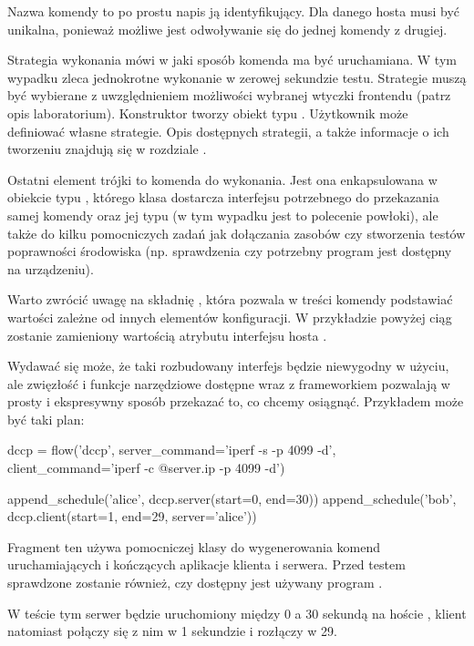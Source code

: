 \documentclass[00-praca-magisterska.tex]{subfiles}
\begin{document}
Nazwa komendy to po prostu napis ją identyfikujący. Dla danego hosta musi być
unikalna, ponieważ możliwe jest odwoływanie się do jednej komendy z drugiej.

Strategia wykonania mówi w jaki sposób komenda ma być uruchamiana. W tym
wypadku  zleca jednokrotne wykonanie w zerowej sekundzie testu.
Strategie muszą być wybierane z uwzględnieniem możliwości wybranej wtyczki
frontendu (patrz opis laboratorium). Konstruktor  tworzy obiekt typu
. Użytkownik może definiować własne strategie. Opis dostępnych
strategii, a także informacje o ich tworzeniu znajdują się w rozdziale
.

Ostatni element trójki to komenda do wykonania. Jest ona enkapsulowana w
obiekcie typu , którego klasa dostarcza interfejsu
potrzebnego do przekazania samej komendy oraz jej typu (w tym wypadku jest to
polecenie powłoki), ale także do kilku pomocniczych zadań jak dołączania
zasobów czy stworzenia testów poprawności środowiska (np. sprawdzenia czy
potrzebny program jest dostępny na urządzeniu).

Warto zwrócić uwagę na składnię , która pozwala w treści komendy
podstawiać wartości zależne od innych elementów konfiguracji. W przykładzie
powyżej ciąg  zostanie zamieniony wartością atrybutu
 interfejsu  hosta .

Wydawać się może, że taki rozbudowany interfejs będzie niewygodny w użyciu, ale
zwięzłość i funkcje narzędziowe dostępne wraz z frameworkiem pozwalają w prosty
i ekspresywny sposób przekazać to, co chcemy osiągnąć. Przykładem może być taki
plan:

\begin{pythoncode}
  dccp = flow('dccp',
      server_command='iperf -s -p 4099 -d',
      client_command='iperf -c @{server.ip} -p 4099 -d')

  append_schedule('alice', dccp.server(start=0, end=30))
  append_schedule('bob',   dccp.client(start=1, end=29, server='alice'))
\end{pythoncode}

Fragment ten używa pomocniczej klasy  do wygenerowania komend
uruchamiających i kończących aplikacje klienta i serwera. Przed testem
sprawdzone zostanie również, czy dostępny jest używany program .

W teście tym serwer będzie uruchomiony między 0 a 30 sekundą na
hoście , klient natomiast połączy się z nim w 1 sekundzie i rozłączy
w 29.
\end{document}
